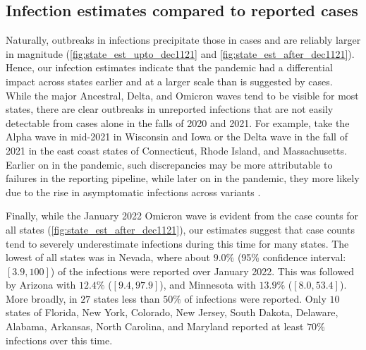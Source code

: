 \documentclass{article}
\begin{document}
\subsection{Infection estimates compared to reported cases}
Naturally, outbreaks in infections precipitate those in cases and are reliably larger in
magnitude (\autoref{fig:state_est_upto_dec1121} and
\autoref{fig:state_est_after_dec1121}).
Hence, our infection estimates indicate
that the pandemic had a differential impact across states earlier and at a larger scale
than is suggested by cases. While the major Ancestral, Delta, and Omicron waves tend to be
visible for most states, there are
clear outbreaks in unreported infections that are not easily detectable from cases alone in the 
falls of 2020 and 2021. For example, take the Alpha wave in 
mid-2021 in Wisconsin and Iowa or the Delta wave in the fall of 2021 in the east coast states of Connecticut, 
Rhode Island, and Massachusetts. Earlier on in the pandemic, such
discrepancies may be more attributable to failures in the reporting pipeline, while
later on in the pandemic, they more likely due to the rise in asymptomatic infections
across variants \citep{oph2022covid, garrett2022high}. 

Finally, while the January 2022 Omicron wave is evident from the case counts for all states 
(\autoref{fig:state_est_after_dec1121}), our estimates suggest that case counts tend to severely 
underestimate infections during this time for many states. The lowest of all states was in Nevada, 
where about $9.0\%$ (95\% confidence interval: $[3.9, 100]$) of the infections were reported 
over January 2022. This was followed by Arizona with $12.4\%$ ($[9.4, 97.9]$), and Minnesota 
with $13.9\%$  ($[8.0, 53.4]$).  More broadly, in $27$ states
less than $50\%$ of infections were reported. Only $10$ states of Florida, New York, Colorado, New Jersey, 
South Dakota, Delaware, Alabama, Arkansas, North Carolina, and Maryland reported at least $70\%$ 
infections over this time. 

\end{document}
